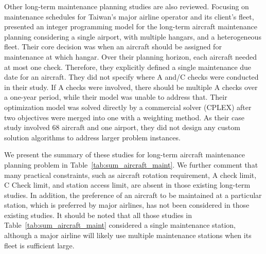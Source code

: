 Other long-term maintenance planning studies are also reviewed. Focusing on maintenance schedules for Taiwan's major airline operator and its client's fleet,
\cite{yan2008long} presented an integer programming model for the long-term aircraft maintenance planning considering a single airport, with multiple hangars, and a heterogeneous fleet. Their core decision was when an aircraft should be assigned for maintenance at which hangar. Over their planning horizon, each aircraft needed at most one check. Therefore, they explicitly defined a single maintenance due date for an aircraft. They did not specify where A and/C checks were conducted in their study. If A checks were involved, there should be multiple A checks over a one-year period, while their model was unable to address that. Their optimization model was solved directly by a commercial solver (CPLEX) after two objectives were merged into one with a weighting method. As their case study involved 68 aircraft and one airport, they did not design any custom solution algorithms to address larger problem instances. 


We present the summary of these studies for long-term aircraft maintenance planning problem in Table~\ref{tab:sum_aircraft_maint}. We further comment that many practical constraints, such as aircraft rotation requirement, A check limit, C Check limit, and station access limit, are absent in those existing long-term studies. In addition, the preference of an aircraft to be maintained at a particular station, which is preferred by major airlines, has not been considered in those existing studies.  It should be noted that all those studies in Table~\ref{tab:sum_aircraft_maint} considered a single maintenance station, although a major airline will likely use multiple maintenance stations when its fleet is sufficient large.


